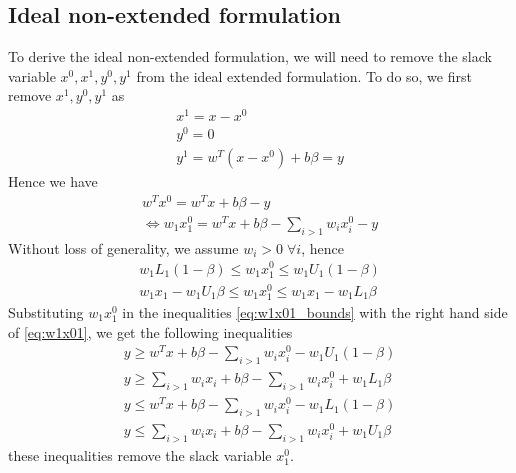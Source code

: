 \documentclass{article}
\begin{document}
\subsection{Ideal non-extended formulation}
To derive the ideal non-extended formulation, we will need to remove the slack variable $x^0, x^1, y^0, y^1$ from the ideal extended formulation. To do so, we first remove $x^1, y^0, y^1$ as
\begin{align}
	x^1 = x - x^0\\
	y^0 = 0\\
	y^1 = w^T(x-x^0) + b\beta = y
\end{align}
Hence we have
\begin{align}
	w^Tx^0 = w^Tx + b\beta-y\\
	\Leftrightarrow w_1x^0_1 = w^Tx + b\beta -\sum_{i>1}w_ix^0_i - y\label{eq:w1x01}
\end{align}
Without loss of generality, we assume $w_i > 0\; \forall i$, hence
\begin{subequations}
\begin{align}
	w_1L_1(1-\beta)\le w_1x^0_1\le w_1U_1(1-\beta)\\
	w_1x_1 - w_1U_1\beta \le w_1x^0_1 \le w_1x_1 - w_1L_1\beta
\end{align}
\label{eq:w1x01_bounds}
\end{subequations}
Substituting $w_1x^0_1$ in the inequalities \eqref{eq:w1x01_bounds} with the right hand side of \eqref{eq:w1x01}, we get the following inequalities
\begin{subequations}
	\begin{align}
		y \ge w^Tx + b\beta - \sum_{i>1}w_ix^0_i - w_1U_1(1-\beta)\\
		y \ge \sum_{i>1}w_ix_i + b\beta - \sum_{i>1}w_ix^0_i + w_1L_1\beta\\
		y \le w^Tx + b\beta - \sum_{i>1}w_ix^0_i - w_1L_1(1-\beta)\\
		y \le \sum_{i>1}w_ix_i + b\beta - \sum_{i>1}w_ix^0_i  + w_1U_1\beta
	\end{align}
\end{subequations}
these inequalities remove the slack variable $x^0_1$.
\end{document}
